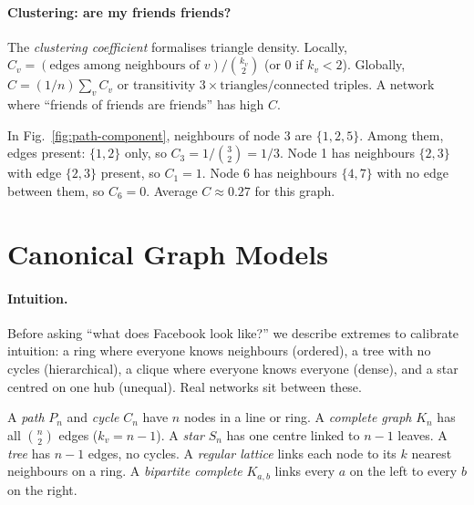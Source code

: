 \paragraph{Clustering: are my friends friends?} The \emph{clustering coefficient} formalises triangle density. Locally, $C_v=(\text{edges among neighbours of }v)/\binom{k_v}{2}$ (or 0 if $k_v<2$). Globally, $C=(1/n)\sum_v C_v$ or transitivity $3\times\text{triangles}/\text{connected triples}$. A network where ``friends of friends are friends'' has high $C$.

\begin{example}\label{ex:clustering}
In Fig.~\ref{fig:path-component}, neighbours of node 3 are $\{1,2,5\}$. Among them, edges present: $\{1,2\}$ only, so $C_3=1/\binom{3}{2}=1/3$. Node 1 has neighbours $\{2,3\}$ with edge $\{2,3\}$ present, so $C_1=1$. Node 6 has neighbours $\{4,7\}$ with no edge between them, so $C_6=0$. Average $C\approx0.27$ for this graph.
\end{example}

\section{Canonical Graph Models}
\label{sec:canonical}
\paragraph{Intuition.} Before asking ``what does Facebook look like?'' we describe extremes to calibrate intuition: a ring where everyone knows neighbours (ordered), a tree with no cycles (hierarchical), a clique where everyone knows everyone (dense), and a star centred on one hub (unequal). Real networks sit between these.

\begin{definition}\label{def:canonical}
A \emph{path} $P_n$ and \emph{cycle} $C_n$ have $n$ nodes in a line or ring. A \emph{complete graph} $K_n$ has all $\binom{n}{2}$ edges ($k_v=n-1$). A \emph{star} $S_n$ has one centre linked to $n-1$ leaves. A \emph{tree} has $n-1$ edges, no cycles. A \emph{regular lattice} links each node to its $k$ nearest neighbours on a ring. A \emph{bipartite complete} $K_{a,b}$ links every $a$ on the left to every $b$ on the right.
\end{definition}

